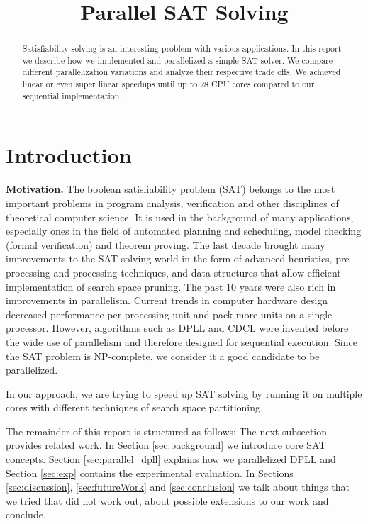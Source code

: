 \documentclass[letterpaper]{article}
\title{Parallel SAT Solving}
\newcommand{\mypar}[1]{{\bf #1.}}
\begin{document}
%
\maketitle
%

\begin{abstract}
Satisfiability solving is an interesting problem with various applications.
In this report we describe how we implemented and parallelized a simple SAT solver.
We compare different parallelization variations and analyze their respective trade offs.
We achieved linear or even super linear speedups until up to 28 CPU cores compared to our sequential implementation.
\end{abstract}

\section{Introduction}\label{sec:intro}

\mypar{Motivation}
The boolean satisfiability problem (SAT) belongs to the most important problems in program analysis, verification and other disciplines of theoretical computer science.
It is used in the background of many applications, especially ones in the field of automated planning and scheduling, model checking (formal verification) and theorem proving.
The last decade brought many improvements to the SAT solving world in the form of advanced heuristics, pre-processing and processing techniques, and data structures that allow efficient implementation of search space pruning.
The past 10 years were also rich in improvements in parallelism.
Current trends in computer hardware design decreased performance per processing unit and pack more units on a single processor.
However, algorithms such as DPLL and CDCL were invented before the wide use of parallelism and therefore designed for sequential execution.
Since the SAT problem is NP-complete, we consider it a good candidate to be parallelized.

In our approach, we are trying to speed up SAT solving by running it on multiple cores with different techniques of search space partitioning.

The remainder of this report is structured as follows:
The next subsection provides related work.
In Section \ref{sec:background} we introduce core SAT concepts.
Section \ref{sec:parallel_dpll} explains how we parallelized DPLL and Section \ref{sec:exp} contains the experimental evaluation.
In Sections \ref{sec:discussion}, \ref{sec:futureWork} and \ref{sec:conclusion} we talk about things that we tried that did not work out, about possible extensions to our work and conclude.
\end{document}
